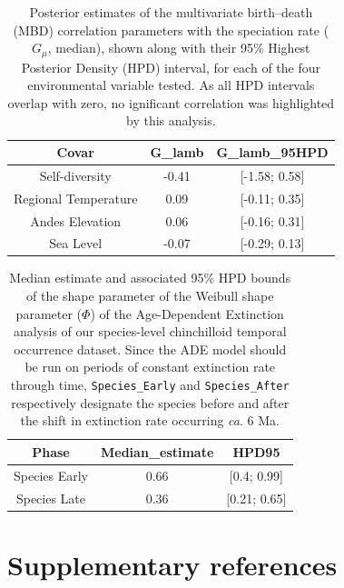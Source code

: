 \documentclass[
  9pt,
  letterpaper,
]{article}
\begin{document}
\begin{longtable}[]{@{}ccc@{}}

\caption{\label{tbl-MBDsp}Posterior estimates of the multivariate
birth--death (MBD) correlation parameters with the speciation rate
(\(G_{\mu}\), median), shown along with their 95\% Highest Posterior
Density (HPD) interval, for each of the four environmental variable
tested. As all HPD intervals overlap with zero, no ignificant
correlation was highlighted by this analysis.}

\tabularnewline

\toprule\noalign{}
Covar & G\_lamb & G\_lamb\_95HPD \\
\midrule\noalign{}
\endhead
\bottomrule\noalign{}
\endlastfoot
Self-diversity & -0.41 & {[}-1.58; 0.58{]} \\
Regional Temperature & 0.09 & {[}-0.11; 0.35{]} \\
Andes Elevation & 0.06 & {[}-0.16; 0.31{]} \\
Sea Level & -0.07 & {[}-0.29; 0.13{]} \\

\end{longtable}

\begin{longtable}[]{@{}ccc@{}}

\caption{\label{tbl-ADEcoeff}Median estimate and associated 95\% HPD
bounds of the shape parameter of the Weibull shape parameter (\(\Phi\))
of the Age-Dependent Extinction analysis of our species-level
chinchilloid temporal occurrence dataset. Since the ADE model should be
run on periods of constant extinction rate through time,
\texttt{Species\_Early} and \texttt{Species\_After} respectively
designate the species before and after the shift in extinction rate
occurring \emph{ca}. 6 Ma.}

\tabularnewline

\toprule\noalign{}
Phase & Median\_estimate & HPD95 \\
\midrule\noalign{}
\endhead
\bottomrule\noalign{}
\endlastfoot
Species Early & 0.66 & {[}0.4; 0.99{]} \\
Species Late & 0.36 & {[}0.21; 0.65{]} \\

\end{longtable}

\newpage{}

\section{Supplementary references}\label{supplementary-references}
\end{document}
